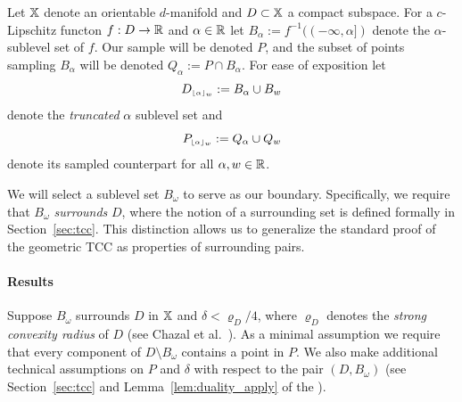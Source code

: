 
Let $\mathbb{X}$ denote an orientable $d$-manifold and $D\subset\mathbb{X}$ a compact subspace.
For a $c$-Lipschitz functon $f : D\to \mathbb{R}$ and $\alpha\in\mathbb{R}$ let $B_\alpha := f^{-1}((-\infty,\alpha])$ denote the $\alpha$-sublevel set of $f$.
Our sample will be denoted $P$, and the subset of points sampling $B_\alpha$ will be denoted $Q_\alpha := P\cap B_\alpha$.
For ease of exposition let
\[ D_{\scriptscriptstyle \lfloor\alpha\rfloor_{w}} := B_\alpha\cup B_w \]
denote the \emph{truncated} $\alpha$ sublevel set and  %
\[ P_{\scriptscriptstyle \lfloor\alpha\rfloor_{w}} := Q_\alpha\cup Q_w\]
denote its sampled counterpart for all $\alpha,w\in\mathbb{R}$.

We will select a sublevel set $B_\omega$ to serve as our boundary.
Specifically, we require that $B_\omega$ \emph{surrounds} $D$, where the notion of a surrounding set is defined formally in Section~\ref{sec:tcc}.
This distinction allows us to generalize the standard proof of the geometric TCC as properties of surrounding pairs.


\paragraph*{Results}

Suppose $B_\omega$ surrounds $D$ in $\mathbb{X}$ and $\delta < \varrho_D / 4$, where $\varrho_D$ denotes the \emph{strong convexity radius} of $D$ (see Chazal et al.~\cite{chazal09analysis}).
As a minimal assumption we require that every component of $D\setminus B_\omega$ contains a point in $P$.
We also make additional technical assumptions on $P$ and $\delta$ with respect to the pair $(D, B_\omega)$ (see Section~\ref{sec:tcc} and Lemma~\ref{lem:duality_apply} of the \fullversion).

